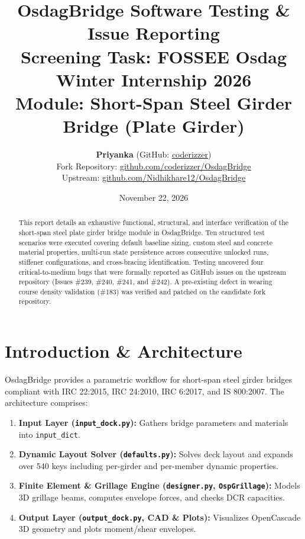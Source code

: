 \documentclass[10pt,a4paper]{article}
\title{\textbf{OsdagBridge Software Testing \& Issue Reporting}\\
\large Screening Task: FOSSEE Osdag Winter Internship 2026\\
\normalsize Module: Short-Span Steel Girder Bridge (Plate Girder)}
\author{\textbf{Priyanka} (GitHub: \href{https://github.com/coderizzer}{coderizzer})\\
Fork Repository: \href{https://github.com/coderizzer/OsdagBridge}{github.com/coderizzer/OsdagBridge}\\
Upstream: \href{https://github.com/Nidhikhare12/OsdagBridge}{github.com/Nidhikhare12/OsdagBridge}}
\date{November 22, 2026}
\begin{document}
\maketitle

\begin{abstract}
This report details an exhaustive functional, structural, and interface verification of the short-span steel plate girder bridge module in OsdagBridge. Ten structured test scenarios were executed covering default baseline sizing, custom steel and concrete material properties, multi-run state persistence across consecutive unlocked runs, stiffener configurations, and cross-bracing identification. Testing uncovered four critical-to-medium bugs that were formally reported as GitHub issues on the upstream repository (Issues \#239, \#240, \#241, and \#242). A pre-existing defect in wearing course density validation (\#183) was verified and patched on the candidate fork repository.
\end{abstract}

\section{Introduction \& Architecture}
OsdagBridge provides a parametric workflow for short-span steel girder bridges compliant with IRC 22:2015, IRC 24:2010, IRC 6:2017, and IS 800:2007. The architecture comprises:
\begin{enumerate}
    \item \textbf{Input Layer (\texttt{input\_dock.py}):} Gathers bridge parameters and materials into \texttt{input\_dict}.
    \item \textbf{Dynamic Layout Solver (\texttt{defaults.py}):} Solves deck layout and expands over 540 keys including per-girder and per-member dynamic properties.
    \item \textbf{Finite Element \& Grillage Engine (\texttt{designer.py}, \texttt{OspGrillage}):} Models 3D grillage beams, computes envelope forces, and checks DCR capacities.
    \item \textbf{Output Layer (\texttt{output\_dock.py}, CAD \& Plots):} Visualizes OpenCascade 3D geometry and plots moment/shear envelopes.
\end{enumerate}
\end{document}
